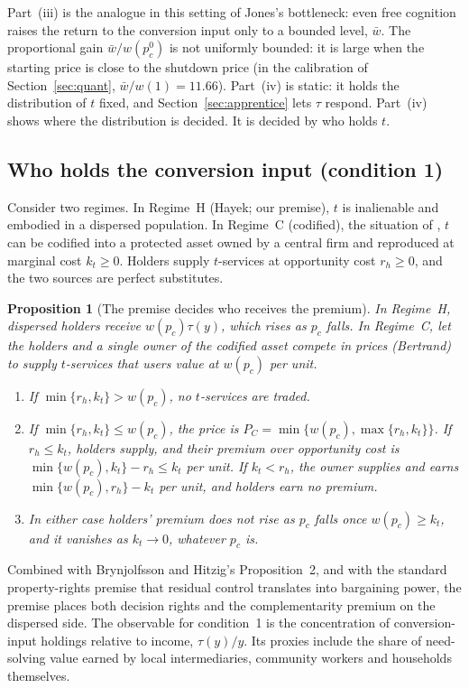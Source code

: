\documentclass[12pt]{article}
\newtheorem{proposition}{Proposition}
\theoremstyle{remark}
\begin{document}
Part~(iii) is the analogue in this setting of Jones's bottleneck: even free cognition raises the return to the conversion input only to a bounded level, $\bar w$. The proportional gain $\bar w/w(p_c^0)$ is not uniformly bounded: it is large when the starting price is close to the shutdown price (in the calibration of Section~\ref{sec:quant}, $\bar w/w(1)=11.66$). Part~(iv) is static: it holds the distribution of $t$ fixed, and Section~\ref{sec:apprentice} lets $\tau$ respond. Part~(iv) shows where the distribution is decided. It is decided by who holds $t$.

\subsection{Who holds the conversion input (condition 1)}\label{sec:regime}

Consider two regimes. In Regime~H (Hayek; our premise), $t$ is inalienable and embodied in a dispersed population. In Regime~C (codified), the situation of \citet[\S12.4.3]{brynjolfsson2026hayek}, $t$ can be codified into a protected asset owned by a central firm and reproduced at marginal cost $k_t\ge0$. Holders supply $t$-services at opportunity cost $r_h\ge0$, and the two sources are perfect substitutes.

\begin{proposition}[The premise decides who receives the premium]\label{prop:regime}
In Regime~H, dispersed holders receive $w(p_c)\tau(y)$, which rises as $p_c$ falls. In Regime~C, let the holders and a single owner of the codified asset compete in prices (Bertrand) to supply $t$-services that users value at $w(p_c)$ per unit.
\begin{enumerate}[label=(\roman*),itemsep=0pt]
\item If $\min\{r_h,k_t\}>w(p_c)$, no $t$-services are traded.
\item If $\min\{r_h,k_t\}\le w(p_c)$, the price is $P_C=\min\{w(p_c),\max\{r_h,k_t\}\}$. If $r_h\le k_t$, holders supply, and their premium over opportunity cost is $\min\{w(p_c),k_t\}-r_h\le k_t$ per unit. If $k_t<r_h$, the owner supplies and earns $\min\{w(p_c),r_h\}-k_t$ per unit, and holders earn no premium.
\item In either case holders' premium does not rise as $p_c$ falls once $w(p_c)\ge k_t$, and it vanishes as $k_t\to0$, whatever $p_c$ is.
\end{enumerate}
\end{proposition}

Combined with Brynjolfsson and Hitzig's Proposition~2, and with the standard property-rights premise that residual control translates into bargaining power, the premise places both decision rights and the complementarity premium on the dispersed side. The observable for condition~1 is the concentration of conversion-input holdings relative to income, $\tau(y)/y$. Its proxies include the share of need-solving value earned by local intermediaries, community workers and households themselves.
\end{document}
